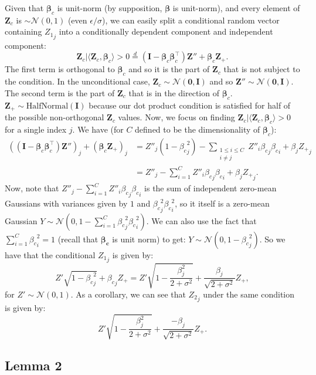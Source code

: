 \documentclass{article} %
\begin{document}
Given that $\bm{\beta}_{c}$ is unit-norm (by supposition, $\bm{\beta}$ is unit-norm), and every element of $\mathbf{Z}_{c}$ is $ \sim \mathcal{N}(0,1)$ (even $\epsilon/\sigma$), we can easily split a conditional random vector containing ${Z_1}_j$ into a conditionally dependent component and independent component:
\[
 \mathbf{Z}_{c} | \langle \mathbf{Z}_{c}, \bm{\beta}_{c}\rangle > 0 \overset{d}{=} (\mathbf{I} - \bm{\beta}_{c}\bm{\beta}_{c}^{\top})\mathbf{Z}'' + \bm{\beta}_{c}\mathbf{Z}_{+}.
\]
The first term is orthogonal to $\bm{\beta}_{c}$ and so it is the part of $\mathbf{Z}_{c}$ that is not subject to the condition. In the unconditional case, $\mathbf{Z}_{c} \sim \mathcal{N}(\mathbf{0}, \mathbf{I})$ and so $\mathbf{Z}''\sim \mathcal{N}(\mathbf{0}, \mathbf{I})$. The second term is the part of $\mathbf{Z}_{c}$ that is in the direction of $\bm{\beta}_{c}$. $\mathbf{Z}_{+} \sim \text{HalfNormal}(\mathbf{I})$ because our dot product condition is satisfied for half of the possible non-orthogonal $\mathbf{Z}_{c}$ values. Now, we focus on finding $\mathbf{Z}_{c} | \langle \mathbf{Z}_{c}, \bm{\beta}_{c}\rangle > 0$ for a single index $j$. We have (for $C$ defined to be the dimensionality of $\bm{\beta}_c$):
\begin{align*}
((\mathbf{I} - \bm{\beta}_{c}\bm{\beta}_{c}^{\top})\mathbf{Z}'')_j + (\bm{\beta}_{c}\mathbf{Z}_{+})_j &= Z''_j(1-{\beta_c}_j^2) - \sum_{\substack{1 \leq i \leq C \\ i \neq j}} Z''_i {\beta_c}_j {\beta_c}_i + \beta_j {Z_+}_j\\
&= Z''_j - \sum_{i = 1}^C Z''_i {\beta_c}_j {\beta_c}_i + \beta_j {Z_+}_j.
\end{align*}
Now, note that $Z''_j - \sum_{i = 1}^C Z''_i {\beta_c}_j {\beta_c}_i$ is the sum of independent zero-mean Gaussians with variances given by $1$ and ${\beta_c}_j^2 {\beta_c}_i^2$, so it itself is a zero-mean Gaussian $Y \sim \mathcal{N}(0, 1-\sum_{i = 1}^C {\beta_c}_j^2 {\beta_c}_i^2)$. We can also use the fact that $\sum_{i = 1}^C {\beta_c}_i^2 = 1$ (recall that $\bm{\beta_c}$ is unit norm) to get: $Y \sim \mathcal{N}(0, 1-{\beta_c}_j^2)$. So we have that the conditional ${Z_1}_j$ is given by:
\[
Z'\sqrt{1-{\beta_c}_j^2} + {\beta_c}_j Z_{+} = Z'\sqrt{1-\frac{\beta_j^2}{2 + \sigma^2}} + \frac{\beta_j}{\sqrt{2+\sigma^2}} Z_{+},
\]
for $Z' \sim \mathcal{N}(0,1)$. As a corollary, we can see that ${Z_2}_j$ under the same condition is given by:
\[
Z'\sqrt{1-\frac{\beta_j^2}{2 + \sigma^2}} + \frac{-\beta_j}{\sqrt{2+\sigma^2}} Z_{+}.
\]

\subsection{Lemma 2}
\end{document}

